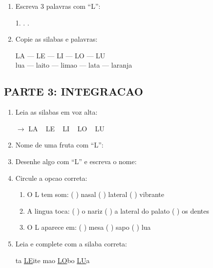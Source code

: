 \begin{exercicio}
\begin{enumerate}[resume]
  \item Escreva 3 palavras com ``L'':
  \begin{center}
  1. \underline{\hspace{4cm}} . \underline{\hspace{4cm}} . \underline{\hspace{4cm}}
  \end{center}

  \item Copie as silabas e palavras:
  \begin{center}
  LA --- LE --- LI --- LO --- LU\\
  lua --- laito --- limao --- lata --- laranja
  \end{center}
\end{enumerate}

\subsection*{PARTE 3: INTEGRACAO}

\begin{enumerate}[resume]
  \item Leia as silabas em voz alta:
  \begin{center}
  $\rightarrow$ LA  ~  LE  ~  LI  ~  LO  ~  LU
  \end{center}

  \item Nome de uma fruta com ``L'':
  \begin{center}
  \underline{\hspace{6cm}}
  \end{center}

  \item Desenhe algo com ``L'' e escreva o nome:
  \begin{center}
  \end{center}

  \item Circule a opcao correta:
  \begin{enumerate}[label=(\alph*)]
    \item O L tem som: ( ) nasal ( ) lateral ( ) vibrante
    \item A lingua toca: ( ) o nariz ( ) a lateral do palato ( ) os dentes
    \item O L aparece em: ( ) mesa ( ) sapo ( ) lua
  \end{enumerate}

  \item Leia e complete com a silaba correta:
  \begin{center}
  ta \quad \underline{LE}ite \quad {}mao \quad \underline{LO}bo \quad \underline{LU}a
  \end{center}
\end{enumerate}
\end{exercicio}

